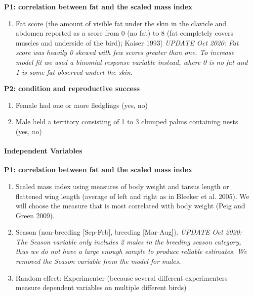 \documentclass[
]{article}
\providecommand{\tightlist}{%
  \setlength{\itemsep}{0pt}\setlength{\parskip}{0pt}}
\begin{document}
\textbf{P1: correlation between fat and the scaled mass index}

\begin{enumerate}
\def\labelenumi{\arabic{enumi})}
\tightlist
\item
  Fat score (the amount of visible fat under the skin in the clavicle
  and abdomen reported as a score from 0 (no fat) to 8 (fat completely
  covers muscles and underside of the bird); Kaiser 1993) \emph{UPDATE
  Oct 2020: Fat score was heavily 0 skewed with few scores greater than
  one. To increase model fit we used a binomial response variable
  instead, where 0 is no fat and 1 is some fat observed undert the
  skin.}
\end{enumerate}

\textbf{P2: condition and reproductive success}

\begin{enumerate}
\def\labelenumi{\arabic{enumi})}
\item
  Female had one or more fledglings (yes, no)
\item
  Male held a territory consisting of 1 to 3 clumped palms containing
  nests (yes, no)
\end{enumerate}

\hypertarget{independent-variables}{%
\paragraph{\texorpdfstring{\textbf{Independent
Variables}}{Independent Variables}}\label{independent-variables}}

\textbf{P1: correlation between fat and the scaled mass index}

\begin{enumerate}
\def\labelenumi{\arabic{enumi})}
\item
  Scaled mass index using measures of body weight and tarsus length or
  flattened wing length (average of left and right as in Bleeker et al.
  2005). We will choose the measure that is most correlated with body
  weight (Peig and Green 2009).
\item
  Season (non-breeding {[}Sep-Feb{]}, breeding {[}Mar-Aug{]}).
  \emph{UPDATE Oct 2020: The Season variable only includes 2 males in
  the breeding season category, thus we do not have a large enough
  sample to produce reliable estimates. We removed the Season variable
  from the model for males.}
\item
  Random effect: Experimenter (because several different experimenters
  measure dependent variables on multiple different birds)
\end{enumerate}
\end{document}
